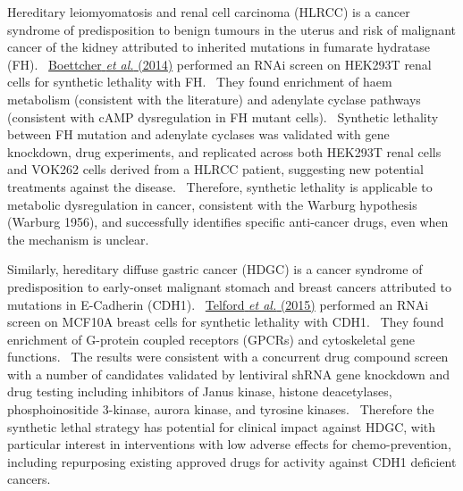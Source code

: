 Hereditary leiomyomatosis and renal cell carcinoma (HLRCC) is a cancer syndrome of predisposition to benign tumours in the uterus and risk of malignant cancer of the kidney attributed to inherited mutations in fumarate hydratase (FH). \ \hyperlink{ENREF14}{Boettcher}\hyperlink{ENREF14}{\textit{ et al.}}\hyperlink{ENREF14}{ (2014)} performed an RNAi screen on HEK293T renal cells for synthetic lethality with FH. \ They found enrichment of haem metabolism (consistent with the literature) and adenylate cyclase pathways (consistent with cAMP dysregulation in FH mutant cells). \ Synthetic lethality between FH mutation and adenylate cyclases was validated with gene knockdown, drug experiments, and replicated across both HEK293T renal cells and VOK262 cells derived from a HLRCC patient, suggesting new potential treatments against the disease. \ Therefore, synthetic lethality is applicable to metabolic dysregulation in cancer, consistent with the Warburg hypothesis (Warburg 1956), and successfully identifies specific anti-cancer drugs, even when the mechanism is unclear. \ 

Similarly, hereditary diffuse gastric cancer (HDGC) is a cancer syndrome of predisposition to early-onset malignant stomach and breast cancers attributed to mutations in E-Cadherin (CDH1). \ \hyperlink{ENREF94}{Telford}\hyperlink{ENREF94}{\textit{ et al.}}\hyperlink{ENREF94}{ (2015)} performed an RNAi screen on MCF10A breast cells for synthetic lethality with CDH1. \ They found enrichment of G-protein coupled receptors (GPCRs) and cytoskeletal gene functions. \ The results were consistent with a concurrent drug compound screen with a number of candidates validated by lentiviral shRNA gene knockdown and drug testing including inhibitors of Janus kinase, histone deacetylases, phosphoinositide 3-kinase, aurora kinase, and tyrosine kinases. \ Therefore the synthetic lethal strategy has potential for clinical impact against HDGC, with particular interest in interventions with low adverse effects for chemo-prevention, including repurposing existing approved drugs for activity against CDH1 deficient cancers. \  

